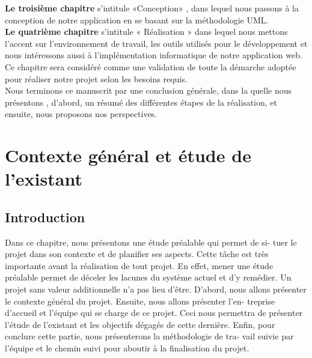 \documentclass[11pt,a4paper,oneside]{book}
\begin{document}
	\textbf{Le troisième chapitre} s'intitule «Conception» , dans lequel nous passons à la conception de notre application en se basant sur la méthodologie UML. \\
	
	\textbf{Le quatrième chapitre} s'intitule « Réalisation » dans lequel nous mettons l’accent sur l’environnement de travail, les outils utilisés pour le développement et nous intéressons aussi à l’implémentation informatique de notre application web. Ce chapitre sera considéré comme une validation de toute la démarche adoptée pour réaliser notre projet selon les besoins requis.\\
	
	Nous terminons ce manuscrit par une conclusion générale, dans la quelle nous présentons , d'abord, un résumé des différentes étapes de la réalisation, et ensuite, nous proposons nos perspectives.
	\tableofcontents
	\listoffigures
	\listoftables
	\mainmatter
	
	\chapter{Contexte général et étude de l’existant}
	
	
	\section{Introduction}
	
	Dans ce chapitre, nous présentons une étude préalable qui permet de si-
	tuer le projet dans son contexte et de planifier ses aspects. Cette tâche est
	très importante avant la réalisation de tout projet. En effet, mener une étude
	préalable permet de déceler les lacunes du système actuel et d’y remédier.
	Un projet sans valeur additionnelle n’a pas lieu d’être. D’abord, nous allons
	présenter le contexte général du projet. Ensuite, nous allons présenter l’en-
	treprise d’accueil et l’équipe qui se charge de ce projet. Ceci nous permettra
	de présenter l’étude de l’existant et les objectifs dégagés de cette dernière.
	Enfin, pour conclure cette partie, nous présenterons la méthodologie de tra-
	vail suivie par l’équipe et le chemin suivi pour aboutir à la finalisation du
	projet.
\end{document}

